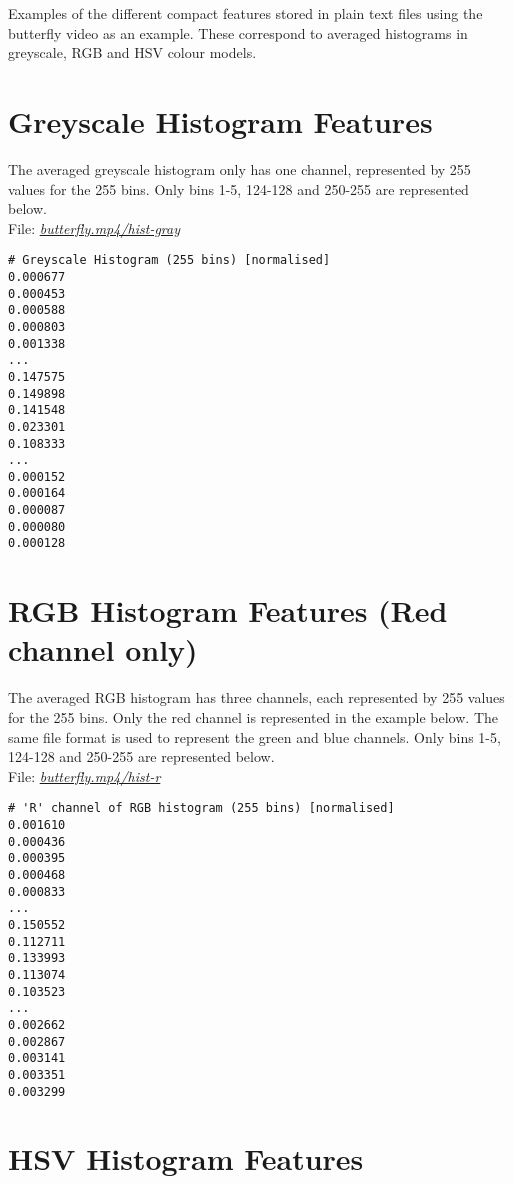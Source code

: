 Examples of the different compact features stored in plain text files using the butterfly video as an example. These correspond to averaged histograms in greyscale, RGB and HSV colour models.


\section{Greyscale Histogram Features}
\label{sec:appendix-txt-greyscale}

The averaged greyscale histogram only has one channel, represented by 255 values for the 255 bins. Only bins 1-5, 124-128 and 250-255 are represented below.\\

File: \underline{\textit{butterfly.mp4/hist-gray}}

\begin{lstlisting}
# Greyscale Histogram (255 bins) [normalised]
0.000677
0.000453
0.000588
0.000803
0.001338
...
0.147575
0.149898
0.141548
0.023301
0.108333
...
0.000152
0.000164
0.000087
0.000080
0.000128
\end{lstlisting}


\section{RGB Histogram Features (Red channel only)}
\label{sec:appendix-txt-rgb}

The averaged RGB histogram has three channels, each represented by 255 values for the 255 bins. Only the red channel is represented in the example below. The same file format is used to represent the green and blue channels. Only bins 1-5, 124-128 and 250-255 are represented below.\\

File: \underline{\textit{butterfly.mp4/hist-r}}

\begin{lstlisting}
# 'R' channel of RGB histogram (255 bins) [normalised]
0.001610
0.000436
0.000395
0.000468
0.000833
...
0.150552
0.112711
0.133993
0.113074
0.103523
...
0.002662
0.002867
0.003141
0.003351
0.003299
\end{lstlisting}


\section{HSV Histogram Features}
\label{sec:appendix-txt-hsv}

